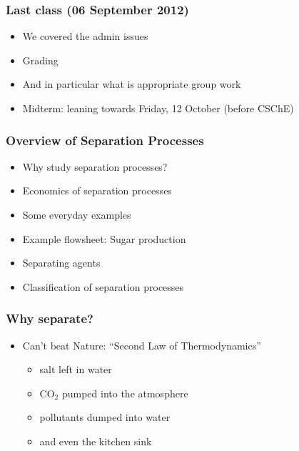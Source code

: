 
\begin{frame}\frametitle{Last class (06 September 2012)}
	\begin{itemize}
		\item	We covered the admin issues
		\item	Grading
		\item	And in particular what is appropriate group work
		\item	Midterm: leaning towards Friday, 12 October (before CSChE)
	\end{itemize}
\end{frame}

\begin{frame}\frametitle{Overview of Separation Processes}
	
	\begin{itemize}
		\item	Why study separation processes?
		\item	Economics of separation processes
		\item	Some everyday examples
		\item	Example flowsheet: Sugar production
		\item	Separating agents
		\item	Classification of separation processes		
	\end{itemize}
\end{frame}

\begin{frame}\frametitle{Why separate?}
	\begin{itemize}
		\item	Can't beat Nature: ``Second Law of Thermodynamics''
			\begin{itemize}
				\item	salt left in water
				\item	$\text{CO}_2$ pumped into the atmosphere
				\item	pollutants dumped into water
				\item	and even the kitchen sink
			\end{itemize}
	\end{itemize}
\end{frame}

